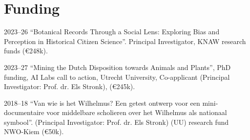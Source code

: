 \documentclass[12pt,letterpaper]{report}
\begin{document}
\nocite{*}
\printbibliography[title=Publications, heading=subbibliography]

\section*{Funding}
\begin{tablist}
\item[2023--26] \tab{}``Botanical Records Through a Social Lens: Exploring Bias
  and Perception in Historical Citizen Science''. Principal Investigator, KNAW
  research funds (€248k).
  \item[2023--27] \tab{}``Mining the Dutch Disposition towards Animals and
    Plants'', PhD funding, AI Labs call to action, Utrecht University,
    Co-applicant (Principal Investigator: Prof. dr. Els Stronk), (€245k).
  \item[2018--18] \tab{}``Van wie is het Wilhelmus? Een getest ontwerp voor een
    mini-documentaire voor middelbare scholieren over het Wilhelmus als
    nationaal symbool''. (Principal Investigator: Prof. dr. Els Stronk) (UU)
    research fund NWO-Kiem (€50k).
\end{tablist}
\end{document}

